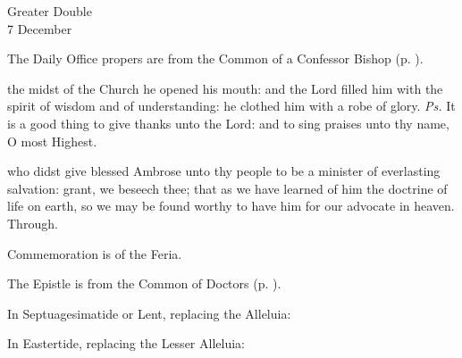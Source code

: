 \begin{inhead}
    {Greater Double\\
7 December}
\end{inhead}

\begin{rubric}
	The Daily Office propers are from the Common of a Confessor Bishop (p. \pageref{CommonConfessorBishopI}).
\end{rubric}

\introit
{} the midst of the Church he opened his mouth: and the Lord filled him with the spirit of wisdom and of understanding: he clothed him with a robe of glory. \textit{Ps.} It is a good thing to give thanks unto the Lord: and to sing praises unto thy name, O most Highest.

\collect
{} who didst give blessed Ambrose unto thy people to be a minister of everlasting salvation: grant, we beseech thee; that as we have learned of him the doctrine of life on earth, so we may be found worthy to have him for our advocate in heaven. Through.

\begin{rubric}
	Commemoration is of the Feria.
\end{rubric}

\begin{rubric}
	The Epistle is from the Common of Doctors (p. \pageref{CommonDoctors}).
\end{rubric}


\begin{rubric}
{In Septuagesimatide or Lent, replacing the Alleluia:}
\end{rubric}\par\noindent
{}

\begin{rubric}
{In Eastertide, replacing the Lesser Alleluia:}
\end{rubric}\par\noindent
{}

